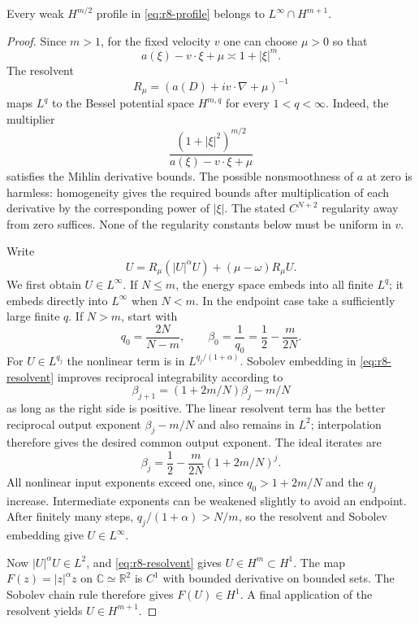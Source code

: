 \begin{lemma}\label{lem:r8-regularity}
Every weak $H^{m/2}$ profile in \eqref{eq:r8-profile} belongs to
$L^\infty\cap H^{m+1}$.
\end{lemma}
\begin{proof}
Since $m>1$, for the fixed velocity $v$ one can choose $\mu>0$ so that
\[
 a(\xi)-v\cdot\xi+\mu\asymp1+|\xi|^m.
\]
The resolvent
\[
 R_\mu=(a(D)+iv\cdot\nabla+\mu)^{-1}
\]
maps $L^q$ to the Bessel potential space $H^{m,q}$ for every
$1<q<\infty$. Indeed, the multiplier
\[
 \frac{(1+|\xi|^2)^{m/2}}
 {a(\xi)-v\cdot\xi+\mu}
\]
satisfies the Mihlin derivative bounds. The possible nonsmoothness
of $a$ at zero is harmless: homogeneity gives the required bounds
after multiplication of each derivative by the corresponding power
of $|\xi|$. The stated $C^{N+2}$ regularity away from zero suffices.
None of the regularity constants below must be uniform in $v$.

Write
\begin{equation}\label{eq:r8-resolvent}
 U=R_\mu(|U|^\alpha U)+(\mu-\omega)R_\mu U.
\end{equation}
We first obtain $U\in L^\infty$. If $N\le m$, the energy space
embeds into all finite $L^q$; it embeds directly into $L^\infty$
when $N<m$. In the endpoint case take a sufficiently large finite $q$.
If $N>m$, start with
\[
 q_0=\frac{2N}{N-m},\qquad
 \beta_0=\frac1{q_0}=\frac12-\frac{m}{2N}.
\]
For $U\in L^{q_j}$ the nonlinear term is in
$L^{q_j/(1+\alpha)}$. Sobolev embedding in
\eqref{eq:r8-resolvent} improves reciprocal integrability according to
\[
 \beta_{j+1}=(1+2m/N)\beta_j-m/N
\]
as long as the right side is positive. The linear resolvent term has
the better reciprocal output exponent $\beta_j-m/N$ and also remains
in $L^2$; interpolation therefore gives the desired common output
exponent. The ideal iterates are
\[
 \beta_j=\frac12-\frac{m}{2N}(1+2m/N)^j.
\]
All nonlinear input exponents exceed one, since
$q_0>1+2m/N$ and the $q_j$ increase. Intermediate exponents can be
weakened slightly to avoid an endpoint. After finitely many steps,
$q_j/(1+\alpha)>N/m$, so the resolvent and Sobolev embedding give
$U\in L^\infty$.

Now $|U|^\alpha U\in L^2$, and \eqref{eq:r8-resolvent} gives
$U\in H^m\subset H^1$. The map
$F(z)=|z|^\alpha z$ on $\mathbb C\simeq\mathbb R^2$ is $C^1$
with bounded derivative on bounded sets. The Sobolev chain rule
therefore gives $F(U)\in H^1$. A final application of the resolvent
yields $U\in H^{m+1}$.
\end{proof}

